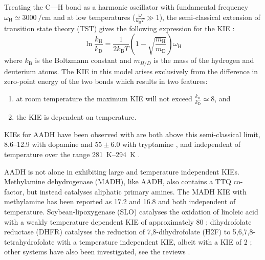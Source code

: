 Treating the C---H bond as a harmonic oscillator with fundamental frequency $\omega_{\mathrm{H}} \simeq \SI{3000}{\per\centi\meter}$ and at low temperatures ($\frac{\omega}{k_{\mathrm{B}}T} \gg 1$), the semi-classical extension of transition state theory (TST) gives the following expression for the KIE \cite{antoniouLargeKineticIsotope1997}:
\begin{equation}\label{eqn:tst_kie}
\ln \frac{k_{\mathrm{H}}}{k_{\mathrm{D}}}=\frac{1}{2k_{\mathrm{B}}T}\left(1-\sqrt{\frac{m_{\mathrm{H}}}{m_{\mathrm{D}}}}\right) \omega_{\mathrm{H}}
\end{equation}
where $k_{\mathrm{B}}$ is the Boltzmann constant and $m_{H/D}$ is the mass of the hydrogen and deuterium atoms. The KIE in this model arises exclusively from the difference in zero-point energy of the two bonds which results in two features:
\begin{enumerate}
    \item at room temperature the maximum KIE will not exceed $\frac{k_{\mathrm{H}}}{k_{\mathrm{D}}} \simeq 8$, and 
    \item the KIE is dependent on temperature. 
\end{enumerate}
KIEs for AADH have been observed with are both above this semi-classical limit,  \numrange[range-phrase=\text{--}]{8.6}{12.9} with dopamine\cite{basranImportanceBarrierShape2001a, hyunUnusuallyLargeIsotope1995a} and  $\num{55}\pm\num{6.0}$ with tryptamine \cite{masgrauAtomicDescriptionEnzyme2006}, and independent of temperature over the range \SIrange{281}{294}{\kelvin} \cite{masgrauAtomicDescriptionEnzyme2006}.

AADH is not alone in exhibiting large and temperature independent KIEs. Methylamine dehydrogenase (MADH), like AADH, also contains a TTQ co-factor, but instead catalyses aliphatic primary amines. The MADH KIE with methylamine has been reported as \num{17.2} \cite{brooksDeuteriumKineticIsotope1993} and \num{16.8} 
\cite{basranEnzymaticHTransferRequires1999} and both independent of temperature.  Soybean-lipoxygenase (SLO) catalyses the oxidation of linoleic acid with a weakly temperature dependent KIE of approximately \num{80} \cite{glickmanExtremelyLargeIsotope1994, knappTemperatureDependentIsotopeEffects2002}; dihydrofolate reductase (DHFR) catalyses the reduction of 7,8-dihydrofolate
(H2F) to 5,6,7,8-tetrahydrofolate with a temperature independent KIE, albeit with a KIE of  \num{2} \cite{sikorskiTunnelingCoupledMotion2004, loveridgeSolventEffectsCatalysis2010a}; other systems have also been investigated, see the reviews \cite{klinmanHydrogenTunnelingLinks2013, puMultidimensionalTunnelingRecrossing2006}.  

